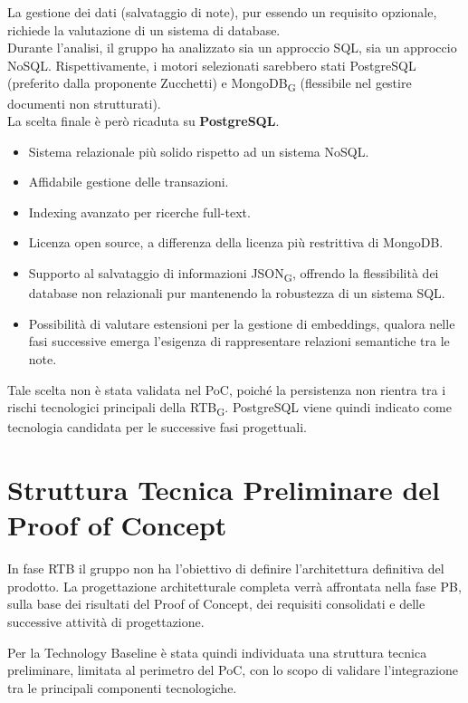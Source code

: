 La gestione dei dati (salvataggio di note), pur essendo un requisito opzionale, richiede la valutazione di un sistema di database. \\
Durante l’analisi, il gruppo ha analizzato sia un approccio SQL, sia un approccio NoSQL. Rispettivamente, i motori selezionati sarebbero stati PostgreSQL (preferito dalla proponente Zucchetti) e MongoDB\textsubscript{G} (flessibile nel gestire documenti non strutturati). \\
La scelta finale è però ricaduta su \textbf{PostgreSQL}.
\begin{itemize}
    \item Sistema relazionale più solido rispetto ad un sistema NoSQL.
    \item Affidabile gestione delle transazioni.
    \item Indexing avanzato per ricerche full-text.
    \item Licenza open source, a differenza della licenza più restrittiva di MongoDB.
    \item Supporto al salvataggio di informazioni JSON\textsubscript{G}, offrendo la flessibilità dei database non relazionali pur mantenendo la robustezza di un sistema SQL.
    \item Possibilità di valutare estensioni per la gestione di embeddings, qualora nelle fasi successive emerga l'esigenza di rappresentare relazioni semantiche tra le note.
\end{itemize}

Tale scelta non è stata validata nel PoC, poiché la persistenza non rientra tra i rischi
tecnologici principali della RTB\textsubscript{G}. PostgreSQL viene quindi indicato come tecnologia candidata
per le successive fasi progettuali.

\section{Struttura Tecnica Preliminare del Proof of Concept}

In fase RTB il gruppo non ha l'obiettivo di definire l'architettura definitiva del prodotto.
La progettazione architetturale completa verrà affrontata nella fase PB, sulla base dei risultati
del Proof of Concept, dei requisiti consolidati e delle successive attività di progettazione.

Per la Technology Baseline è stata quindi individuata una struttura tecnica preliminare,
limitata al perimetro del PoC, con lo scopo di validare l'integrazione tra le principali
componenti tecnologiche.


